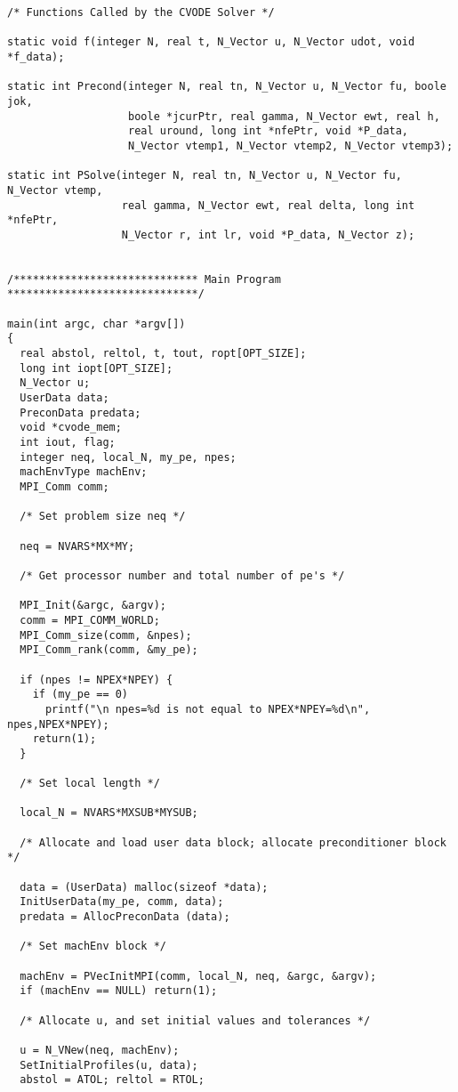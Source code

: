 \begin{verbatim}
/* Functions Called by the CVODE Solver */

static void f(integer N, real t, N_Vector u, N_Vector udot, void *f_data);

static int Precond(integer N, real tn, N_Vector u, N_Vector fu, boole jok,
                   boole *jcurPtr, real gamma, N_Vector ewt, real h,
                   real uround, long int *nfePtr, void *P_data,
                   N_Vector vtemp1, N_Vector vtemp2, N_Vector vtemp3);

static int PSolve(integer N, real tn, N_Vector u, N_Vector fu, N_Vector vtemp,
                  real gamma, N_Vector ewt, real delta, long int *nfePtr,
                  N_Vector r, int lr, void *P_data, N_Vector z);


/***************************** Main Program ******************************/

main(int argc, char *argv[])
{
  real abstol, reltol, t, tout, ropt[OPT_SIZE];
  long int iopt[OPT_SIZE];
  N_Vector u;
  UserData data;
  PreconData predata;
  void *cvode_mem;
  int iout, flag;
  integer neq, local_N, my_pe, npes;
  machEnvType machEnv;
  MPI_Comm comm;

  /* Set problem size neq */

  neq = NVARS*MX*MY;

  /* Get processor number and total number of pe's */

  MPI_Init(&argc, &argv);
  comm = MPI_COMM_WORLD;
  MPI_Comm_size(comm, &npes);
  MPI_Comm_rank(comm, &my_pe);

  if (npes != NPEX*NPEY) {
    if (my_pe == 0)
      printf("\n npes=%d is not equal to NPEX*NPEY=%d\n", npes,NPEX*NPEY);
    return(1);
  }

  /* Set local length */

  local_N = NVARS*MXSUB*MYSUB;

  /* Allocate and load user data block; allocate preconditioner block */

  data = (UserData) malloc(sizeof *data);
  InitUserData(my_pe, comm, data);
  predata = AllocPreconData (data);

  /* Set machEnv block */

  machEnv = PVecInitMPI(comm, local_N, neq, &argc, &argv);
  if (machEnv == NULL) return(1);

  /* Allocate u, and set initial values and tolerances */ 

  u = N_VNew(neq, machEnv);
  SetInitialProfiles(u, data);
  abstol = ATOL; reltol = RTOL;


\end{verbatim}
